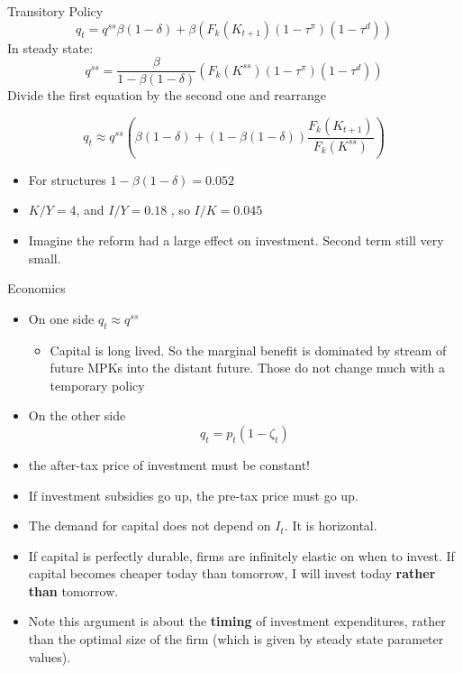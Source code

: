 \documentclass[11pt,aspectratio=169,xcolor={dvipsnames},hyperref={pdftex,pdfpagemode=UseNone,hidelinks,pdfdisplaydoctitle=true},usepdftitle=false]{beamer}
\begin{document}
\begin{frame}{Transitory Policy}
\[q_t = q^{ss} \beta (1-\delta)  + \beta \left(F_k(K_{t+1})(1-\tau^{\pi})(1-\tau^d)  \right) \]
In steady state:
\[q^{ss} = \frac{\beta}{1-\beta(1-\delta)}\left(F_k(K^{ss}) (1-\tau^{\pi})(1-\tau^d) \right) \]
Divide the first equation by the second one and rearrange

\[q_t \approx q^{ss} \left(\beta(1-\delta) + (1-\beta(1-\delta)) \frac{F_k(K_{t+1})}{F_k(K^{ss})} \right) \]
\begin{itemize}
\item For structures $1-\beta(1-\delta) = 0.052$
\item $K/Y = 4$, and $I/Y = 0.18$ , so $I/K = 0.045$
\item Imagine the reform had a large effect on investment. Second term still very small.
\end{itemize}
\end{frame}

\begin{frame}{Economics}
\begin{itemize}
\item On one side $q_t \approx q^{ss}$
\begin{itemize}
\item Capital is long lived. So the marginal benefit is dominated by stream of future MPKs into the distant future. Those do not change much with a temporary policy
\end{itemize}
\item On the other side
\[ q_t = p_t(1-\zeta_t)\]
\item the after-tax price of investment must be constant!
\item If investment subsidies go up, the pre-tax price must go up.
\item  The demand for capital does not depend on $I_t$. It is horizontal.
\item If capital is perfectly durable, firms are infinitely elastic on when to invest. If capital becomes cheaper today than tomorrow, I will invest today \textbf{rather than} tomorrow.
\item Note this argument is about the \textbf{timing} of investment expenditures, rather than the optimal size of the firm (which is given by steady state parameter values).
\end{itemize}
\end{frame}
\end{document}
